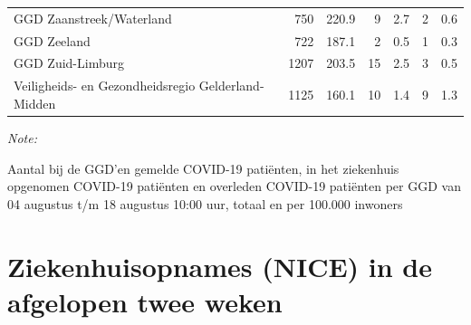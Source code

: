 \documentclass[
  english,
  man,floatsintext]{apa6}
\begin{document}
\begin{table}
\begin{threeparttable}
\begin{tabular}{lrrrrrr}
GGD Zaanstreek/Waterland & 750 & 220.9 & 9 & 2.7 & 2 & 0.6\\
GGD Zeeland & 722 & 187.1 & 2 & 0.5 & 1 & 0.3\\
GGD Zuid-Limburg & 1207 & 203.5 & 15 & 2.5 & 3 & 0.5\\
Veiligheids- en Gezondheidsregio Gelderland-Midden & 1125 & 160.1 & 10 & 1.4 & 9 & 1.3\\
\bottomrule
\end{tabular}
\begin{tablenotes}
\item \textit{Note: } 
\item Aantal bij de GGD’en gemelde COVID-19 patiënten, in het ziekenhuis opgenomen COVID-19 patiënten en overleden COVID-19 patiënten per GGD van 04 augustus t/m 18 augustus 10:00 uur, totaal en per 100.000 inwoners
\end{tablenotes}
\end{threeparttable}
\endgroup{}
\end{table}

\newpage

\hypertarget{ziekenhuisopnames-nice-in-de-afgelopen-twee-weken}{%
\section{Ziekenhuisopnames (NICE) in de afgelopen twee weken}\label{ziekenhuisopnames-nice-in-de-afgelopen-twee-weken}}
\end{document}
